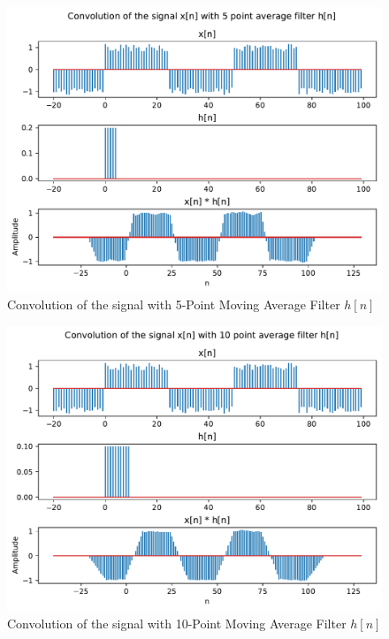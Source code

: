 \documentclass[10pt,a4paper, margin=1in]{article}
\begin{document}
\begin{enumerate}
\begin{enumerate}
    \begin{figure}[!htb]
    \centering
    \includegraphics[width=1\textwidth]{q7/7b_convolution5.pdf}
    \caption{Convolution of the signal with 5-Point Moving Average Filter $h[n]$}
    \label{fig:figure2}
    \end{figure}
    
    \begin{figure}[!htb]
    \centering
    \includegraphics[width=1\textwidth]{q7/7b_convolution10.pdf}
    \caption{Convolution of the signal with 10-Point Moving Average Filter $h[n]$}
    \label{fig:figure2}
    \end{figure}
    

\end{enumerate}
\end{enumerate}
\end{document}
